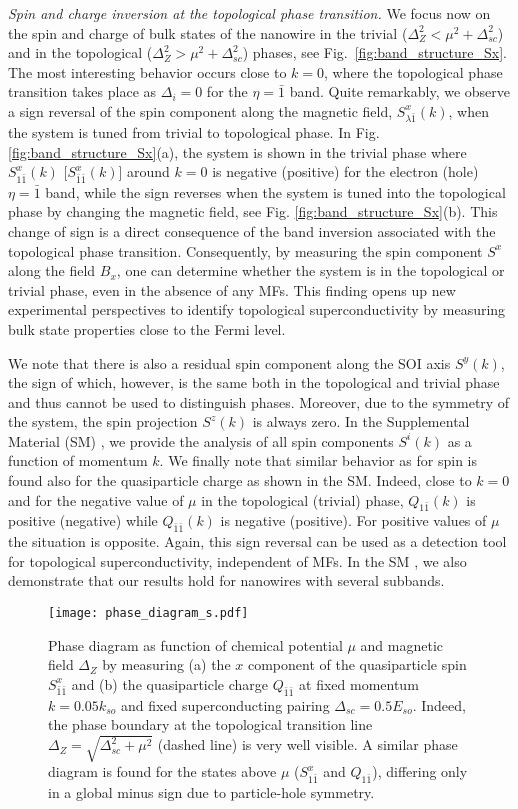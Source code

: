 \documentclass[prl,twocolumn,showpacs,floatfix,amsbsy,amsbsy,superscriptaddress]{revtex4-1}
\begin{document}
{\it Spin and charge inversion at the topological phase transition.} 
We focus now on the spin and charge of bulk states of the nanowire in the trivial ($\Delta_Z^2<\mu^2+\Delta^2_{sc}$) and in the topological ($\Delta_Z^2>\mu^2+\Delta^2_{sc}$) phases, see Fig.~\ref{fig:band_structure_Sx}.
The most interesting behavior occurs close to $k=0$, where the topological  phase transition takes place as $\Delta_i=0$ for the $\eta=\bar 1$ band. Quite remarkably, we observe a sign reversal of the spin component along the magnetic field, $S^x_{\lambda \bar1 }(k)$, when the system is tuned from trivial to topological phase.
In Fig. \ref{fig:band_structure_Sx}(a), the system is shown in the trivial phase where $S^x_{1\bar 1}(k)$ [$S^x_{\bar1\bar 1}(k)$] around $k=0$ is negative (positive) for the electron (hole)  $\eta=\bar 1$ band, while the sign reverses when the system is tuned into the topological phase by changing the magnetic field, see Fig. \ref{fig:band_structure_Sx}(b).
This change of sign is a direct consequence of the band inversion associated with the topological phase transition. Consequently, by measuring the spin component $S^x$ along the field $B_x$, one can determine whether the system is in the topological or trivial phase, even in the absence of any MFs.
 This  finding opens up new experimental perspectives to identify topological superconductivity by measuring bulk state properties close to the Fermi level.  

We note that there is also a residual spin component along the SOI axis $S^y(k)$, the sign of which, however, is the same  both in the topological and trivial phase and thus cannot be used to distinguish phases. Moreover, due to the symmetry of the system, the spin projection $S^z(k)$ is always zero. In the Supplemental Material (SM) \cite{SM}, we provide the analysis of all spin components $S^i(k)$ 
as a function of momentum $k$.
We finally note that 
similar behavior as for spin is found also for the quasiparticle charge as shown in the SM. Indeed,
close to $k=0$ and for the negative value of $\mu$ in the topological (trivial) phase, $Q_{1 \bar 1}(k)$ is positive (negative) while $Q_{\bar 1 \bar 1}(k)$ is  negative (positive). For positive values of $\mu$ the situation is opposite.
Again, this sign reversal can be used as a detection tool for topological superconductivity, independent of MFs. In the SM \cite{SM}, we also demonstrate that our results hold for nanowires with several subbands.

\begin{figure}[t]
\centering
\texttt{[image: phase\_diagram\_s.pdf]}
\caption{ 
Phase diagram as function of chemical potential $\mu$ and magnetic field $\Delta_Z$ by measuring (a) the $x$ component of the quasiparticle spin $S^x_{\bar1\bar1}$ and (b) the quasiparticle charge $Q_{\bar1\bar1}$ at fixed momentum $k=0.05k_{so}$ and fixed superconducting pairing $\Delta_{sc}=0.5E_{so}$. 
 Indeed, the phase boundary at the topological  transition line $\Delta_Z=\sqrt{\Delta_{sc}^2+\mu^2}$ (dashed line) is very well visible.
A similar phase diagram is found for the states above $\mu$ ($S^x_{1\bar1}$ and $Q_{1\bar1}$), differing only in a global minus sign due to  particle-hole symmetry.}
  \label{fig:phase_diagram}
\end{figure}
\end{document}
